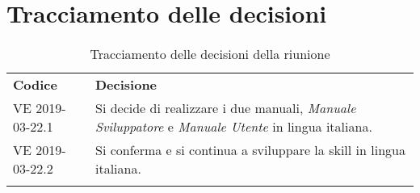 \clearpage
\section{Tracciamento delle decisioni}
\begin{center}
	\renewcommand{\arraystretch}{1.5}
	\begin{longtable}{  p{2.8cm} p{11.4cm} }
		\rowcolor{tableHeadYellow}
		\textbf{Codice}&\textbf{Decisione}\\
		VE 2019-03-22.1 & Si decide di realizzare i due manuali, \textit{Manuale Sviluppatore} e \textit{Manuale Utente} in lingua italiana.\\
		VE 2019-03-22.2 & Si conferma e si continua a sviluppare la skill in lingua italiana.\\
		\rowcolor{white}
		\caption{Tracciamento delle decisioni della riunione}
	\end{longtable}	
\end{center}